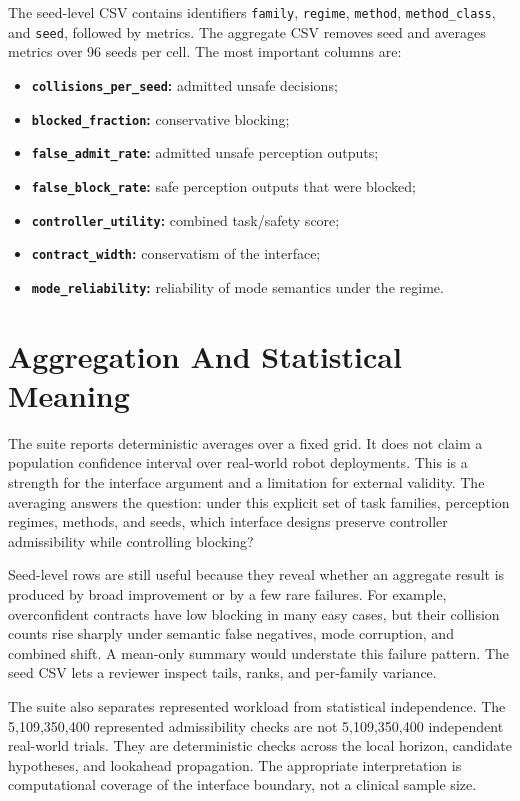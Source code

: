 \documentclass{article}
\newcommand{\fullscale}{5,109,350,400}
\begin{document}
The seed-level CSV contains identifiers \texttt{family}, \texttt{regime}, \texttt{method}, \texttt{method\_class}, and \texttt{seed}, followed by metrics. The aggregate CSV removes seed and averages metrics over 96 seeds per cell. The most important columns are:
\begin{itemize}
    \item \textbf{\texttt{collisions\_per\_seed}:} admitted unsafe decisions;
    \item \textbf{\texttt{blocked\_fraction}:} conservative blocking;
    \item \textbf{\texttt{false\_admit\_rate}:} admitted unsafe perception outputs;
    \item \textbf{\texttt{false\_block\_rate}:} safe perception outputs that were blocked;
    \item \textbf{\texttt{controller\_utility}:} combined task/safety score;
    \item \textbf{\texttt{contract\_width}:} conservatism of the interface;
    \item \textbf{\texttt{mode\_reliability}:} reliability of mode semantics under the regime.
\end{itemize}

\section{Aggregation And Statistical Meaning}

The suite reports deterministic averages over a fixed grid. It does not claim a population confidence interval over real-world robot deployments. This is a strength for the interface argument and a limitation for external validity. The averaging answers the question: under this explicit set of task families, perception regimes, methods, and seeds, which interface designs preserve controller admissibility while controlling blocking?

Seed-level rows are still useful because they reveal whether an aggregate result is produced by broad improvement or by a few rare failures. For example, overconfident contracts have low blocking in many easy cases, but their collision counts rise sharply under semantic false negatives, mode corruption, and combined shift. A mean-only summary would understate this failure pattern. The seed CSV lets a reviewer inspect tails, ranks, and per-family variance.

The suite also separates represented workload from statistical independence. The \fullscale{} represented admissibility checks are not \fullscale{} independent real-world trials. They are deterministic checks across the local horizon, candidate hypotheses, and lookahead propagation. The appropriate interpretation is computational coverage of the interface boundary, not a clinical sample size.
\end{document}
